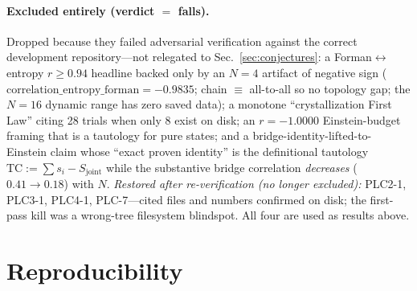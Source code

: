 \documentclass[aps,pra,twocolumn,superscriptaddress,floatfix]{revtex4-2}
\theoremstyle{definition}
\begin{document}
\paragraph{Excluded entirely (verdict $=$ falls).}
Dropped because they failed adversarial verification against the correct
development repository---not relegated to Sec.~\ref{sec:conjectures}: a
Forman$\leftrightarrow$entropy $r\geq0.94$ headline backed only by an $N=4$
artifact of negative sign ($\mathrm{correlation\_entropy\_forman}=-0.9835$;
chain $\equiv$ all-to-all so no topology gap; the $N=16$ dynamic range has zero
saved data); a monotone ``crystallization First Law'' citing 28 trials when only
8 exist on disk; an $r=-1.0000$ Einstein-budget framing that is a tautology for
pure states; and a bridge-identity-lifted-to-Einstein claim whose ``exact proven
identity'' is the definitional tautology $\mathrm{TC}:=\sum s_i-S_{\mathrm{joint}}$
while the substantive bridge correlation \emph{decreases} ($0.41\to0.18$) with
$N$. \emph{Restored after re-verification (no longer excluded):} PLC2-1, PLC3-1,
PLC4-1, PLC-7---cited files and numbers confirmed on disk; the first-pass kill
was a wrong-tree filesystem blindspot. All four are used as results above.

\section{Reproducibility}
\label{app:repro}
\end{document}
